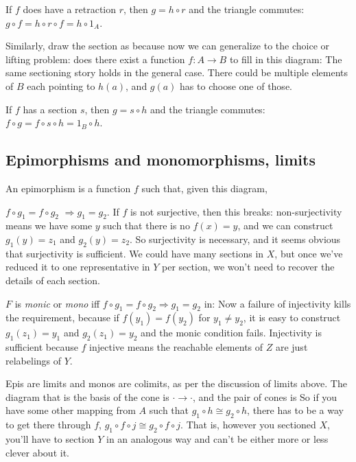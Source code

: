 \documentclass[11pt]{article}
\begin{document}
If $f$ does have a retraction $r$, then $g=h\circ r$ and the triangle commutes: $g\circ f =  h\circ r\circ f = h\circ 1_A$.

Similarly, draw the section as
because now we can generalize to the choice or lifting problem: does there exist
a function $f:A\to B$ to fill in this diagram:
The same sectioning story holds in the general case. There could be multiple elements of
$B$ each pointing to $h(a)$, and $g(a)$ has to choose one of those.

If $f$ has a section $s$, then $g=s\circ h$ and the triangle commutes: $f\circ g =  f\circ s\circ h = 1_B\circ h$.

\subsection{Epimorphisms and monomorphisms, limits}
An epimorphism is a function $f$ such that, given this diagram,


$f\circ g_1 = f\circ g_2$ $\Rightarrow g_1 = g_2$. If $f$ is not surjective, then
this breaks: non-surjectivity means we have some $y$ such that there is no $f(x)=y$,
and we can construct $g_1(y)=z_1$ and $g_2(y)=z_2$. So surjectivity is necessary, and
it seems obvious that surjectivity is sufficient. We could have many sections in $X$, but
once we've reduced it to one representative in $Y$ per section, we won't need to recover
the details of each section.

$F$ is {\em monic} or {\em mono} iff $f \circ g_1 = f \circ g_2 \Rightarrow g_1 = g_2$ in:
Now a failure of injectivity kills the requirement, because if $f(y_1)=f(y_2)$ for
$y_1\neq y_2$, it is easy to construct $g_1(z_1)=y_1$ and $g_2(z_1)=y_2$ and the monic
condition fails. Injectivity is sufficient because $f$ injective means the reachable
elements of $Z$ are just relabelings of $Y$.

Epis are limits and monos are colimits, as per the discussion of limits above. The diagram
that is the basis of the cone is $\cdot \to \cdot$, and the pair of cones is
So if you have some other mapping from $A$ such that $g_1\circ h\cong g_2\circ h$,
there has to be a way to get there through $f$, $g_1\circ f\circ j \cong g_2\circ f\circ
j$. That is, however you sectioned $X$, you'll have to section $Y$ in an analogous way and
can't be either more or less clever about it.
\end{document}
